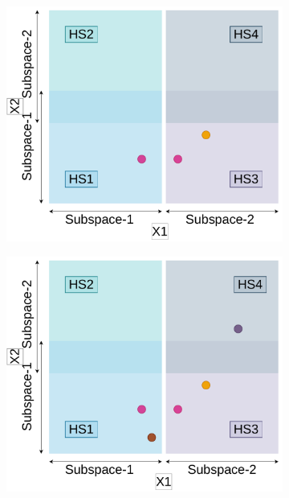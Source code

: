 \begin{figure}[H]
\begin{subfigure}{0.45\textwidth}
		\caption{}
		\label{fig:ovr-dsbo-d}
	\end{subfigure}
	\begin{subfigure}{0.45\textwidth}
		\centering
		\includegraphics[scale=0.3]{figures/ovr-dbo/ovr-dbo-05.pdf}
		\caption{}
		\label{fig:ovr-dsbo-e}
	\end{subfigure}
	\begin{subfigure}{0.45\textwidth}
		\centering
		\includegraphics[scale=0.3]{figures/ovr-dbo/ovr-dbo-06.pdf}
		\caption{}

\end{subfigure}
\end{figure}
